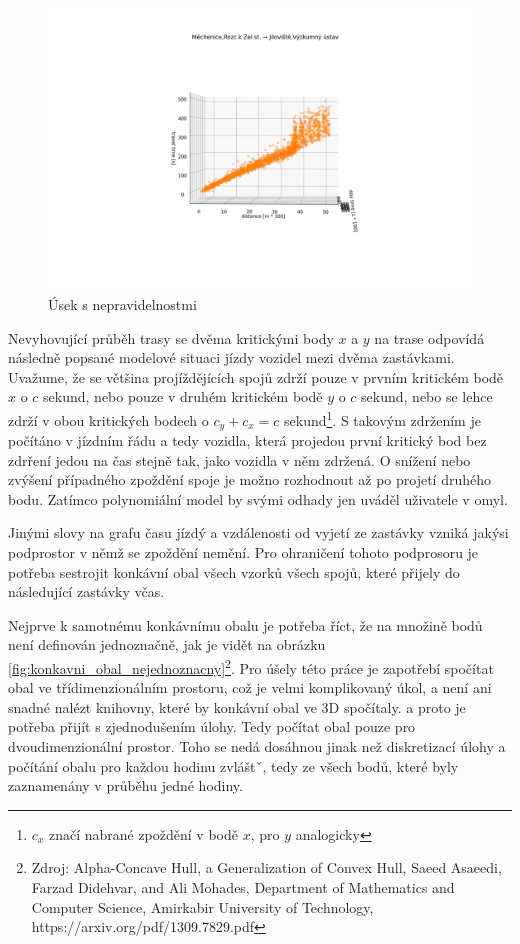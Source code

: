 \begin{figure}
	\centering
  \includegraphics[width=\linewidth]{../img/nepredvidatelne_zdrzeni.png}
  \caption{Úsek s nepravidelnostmi}
  \label{fig:nepredvidatelne_zdrzeni}
\end{figure}

Nevyhovující průběh trasy se dvěma kritickými body $x$ a $y$ na trase odpovídá následně popsané modelové situaci jízdy vozidel mezi dvěma zastávkami. Uvažume, že se většina projíždějících spojů zdrží pouze v prvním kritickém bodě $x$ o $c$ sekund, nebo pouze v druhém kritickém bodě $y$ o $c$ sekund, nebo se lehce zdrží v obou kritických bodech o $c_y + c_x = c$ sekund\footnote{$c_x$ značí nabrané zpoždění v bodě $x$, pro $y$ analogicky}. S takovým zdržením je počítáno v jízdním řádu a tedy vozidla, která projedou první kritický bod bez zdrření jedou na čas stejně tak, jako vozidla v něm zdržená. O snížení nebo zvýšení případného zpoždění spoje je možno rozhodnout až po projetí druhého bodu. Zatímco polynomiální model by svými odhady jen uváděl uživatele v omyl.

\bigbreak

Jinými slovy na grafu času jízdý a vzdálenosti od vyjetí ze zastávky vzniká jakýsi podprostor v němž se zpoždění nemění. Pro ohraničení tohoto podprosoru je potřeba sestrojit konkávní obal všech vzorků všech spojů, které přijely do následující zastávky včas.

\bigbreak

Nejprve k samotnému konkávnímu obalu je potřeba říct, že na množině bodů není definován jednoznačně, jak je vidět na obrázku \ref{fig:konkavni_obal_nejednoznacny}\footnote{Zdroj: Alpha-Concave Hull, a Generalization of Convex Hull, Saeed Asaeedi, Farzad Didehvar, and Ali Mohades, Department of Mathematics and Computer Science, Amirkabir University of Technology, https://arxiv.org/pdf/1309.7829.pdf}. Pro úšely této práce je zapotřebí spočítat obal ve třídimenzionálním prostoru, což je velmi komplikovaný úkol, a není ani snadné nalézt knihovny, které by konkávní obal ve 3D spočítaly. a proto je potřeba přijít s zjednodušením úlohy. Tedy počítat obal pouze pro dvoudimenzionální prostor. Toho se nedá dosáhnou jinak než diskretizací úlohy a počítání obalu pro každou hodinu zvláštˇ, tedy ze všech bodů, které byly zaznamenány v průběhu jedné hodiny.


